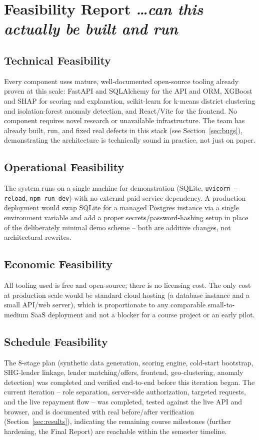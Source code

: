 \documentclass[11pt,a4paper]{article}
\newcommand{\BvrHint}[1]{%
  {\normalfont\normalsize\itshape\hfill #1}}
\begin{document}
\section{Feasibility Report%
\BvrHint{\ldots can this actually be built and run}}

\subsection{Technical Feasibility}
Every component uses mature, well-documented open-source tooling
already proven at this scale: FastAPI and SQLAlchemy for the API and
ORM, XGBoost and SHAP for scoring and explanation, scikit-learn for
k-means district clustering and isolation-forest anomaly detection,
and React/Vite for the frontend. No component requires novel research
or unavailable infrastructure. The team has already built, run, and
fixed real defects in this stack (see Section~\ref{sec:bugs}),
demonstrating the architecture is technically sound in practice, not
just on paper.

\subsection{Operational Feasibility}
The system runs on a single machine for demonstration (SQLite,
\texttt{uvicorn --reload}, \texttt{npm run dev}) with no external paid
service dependency. A production deployment would swap SQLite for a
managed Postgres instance via a single environment variable and add a
proper secrets/password-hashing setup in place of the deliberately
minimal demo scheme -- both are additive changes, not architectural
rewrites.

\subsection{Economic Feasibility}
All tooling used is free and open-source; there is no licensing cost.
The only cost at production scale would be standard cloud hosting
(a database instance and a small API/web server), which is
proportionate to any comparable small-to-medium SaaS deployment and
not a blocker for a course project or an early pilot.

\subsection{Schedule Feasibility}
The 8-stage plan (synthetic data generation, scoring engine,
cold-start bootstrap, SHG-lender linkage, lender matching/offers,
frontend, geo-clustering, anomaly detection) was completed and
verified end-to-end before this iteration began. The current
iteration -- role separation, server-side authorization, targeted
requests, and the live repayment flow -- was completed, tested against
the live API and browser, and is documented with real before/after
verification (Section~\ref{sec:results}), indicating the remaining
course milestones (further hardening, the Final Report) are reachable
within the semester timeline.
\end{document}
